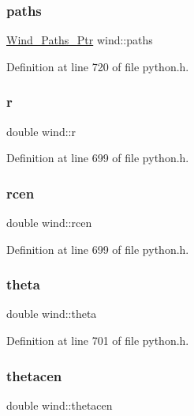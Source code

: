 \subsubsection{\texorpdfstring{paths}{paths}}
{\footnotesize\ttfamily \hyperlink{python_8h_af5cbc81f9fbd8ac7596e3a989073df45}{Wind\+\_\+\+Paths\+\_\+\+Ptr} wind\+::paths}



Definition at line 720 of file python.\+h.

\mbox{\label{structwind_a68090533c7fa4c2bc4f1272a71012b5c}} 
\subsubsection{\texorpdfstring{r}{r}}
{\footnotesize\ttfamily double wind\+::r}



Definition at line 699 of file python.\+h.

\mbox{\label{structwind_a94d793823c987a311e4abcd1f2c4aad0}} 
\subsubsection{\texorpdfstring{rcen}{rcen}}
{\footnotesize\ttfamily double wind\+::rcen}



Definition at line 699 of file python.\+h.

\mbox{\label{structwind_ab555fb67dfd86ffa4710da52b5edd39d}} 
\subsubsection{\texorpdfstring{theta}{theta}}
{\footnotesize\ttfamily double wind\+::theta}



Definition at line 701 of file python.\+h.

\mbox{\label{structwind_a876ccd0541a3488e8faa62f1a9edc080}} 
\subsubsection{\texorpdfstring{thetacen}{thetacen}}
{\footnotesize\ttfamily double wind\+::thetacen}




